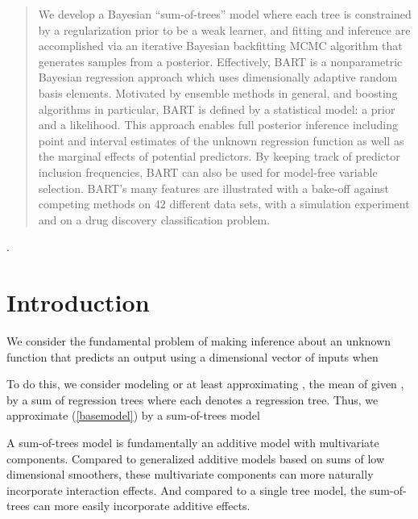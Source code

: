 \documentclass[aoas,nameyear,dvips]{arximspdf}
\begin{document}
\begin{frontmatter}
\begin{abstract}
We develop a Bayesian ``sum-of-trees'' model where each
tree is constrained by a regularization prior to be a weak learner,
and fitting and inference are accomplished via an iterative Bayesian
backfitting MCMC algorithm that generates samples from a posterior.
Effectively, BART is a nonparametric Bayesian regression approach
which uses dimensionally adaptive random basis elements.  Motivated by ensemble methods
in general, and boosting algorithms in particular,  BART is defined by a
statistical model: a prior and a likelihood.  This approach enables full posterior inference
including point and interval estimates of the unknown regression function as
well as the marginal effects of potential predictors.  By keeping track of predictor
inclusion frequencies, BART can also be used for model-free variable selection.
BART's many features are illustrated with a bake-off against competing methods
on 42 different data sets, with a simulation experiment and on a
drug discovery classification problem.
\end{abstract}

\begin{keyword}
.
\end{keyword}


\end{frontmatter}

\section{Introduction}\label{sec:intro}


We consider the fundamental problem of making inference about an
unknown function  that predicts an output  using a 
dimensional vector of inputs  when

To do this, we consider modeling or at least approximating , the mean of  given , by a sum of 
regression trees 
where each  denotes a regression tree.  Thus, we approximate
(\ref{basemodel}) by a sum-of-trees model


A sum-of-trees model is fundamentally an additive model with multivariate components.
Compared to generalized additive models based on sums of low dimensional smoothers,
these multivariate components can more naturally incorporate interaction effects.
And compared to a single tree model, the sum-of-trees can more easily
incorporate additive effects.
\end{document}
